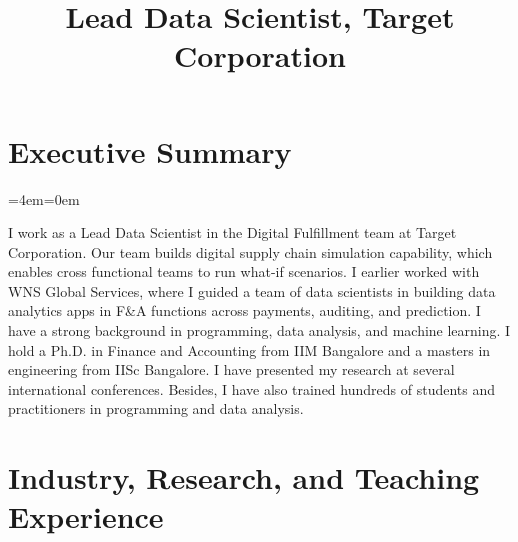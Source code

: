 \documentclass[11pt,a4paper,]{moderncv}
\title{Lead Data Scientist, Target Corporation}
\begin{document}
\makecvtitle



\newenvironment{smallblockquote}{%
  \par%
  \medskip
  \leftskip=2em\rightskip=0em%
  \noindent\ignorespaces}{%
  \par\medskip}

\newenvironment{blockquote}{%
  \par%
  \medskip
  \leftskip=4em\rightskip=0em%
  \noindent\ignorespaces}{%
  \par\medskip}

\hypertarget{executive-summary}{%
\section{Executive Summary}\label{executive-summary}}

\begingroup
\bgroup %
  \par%
  \medskip
  \leftskip=4em\rightskip=0em%
  \noindent\ignorespaces

I work as a Lead Data Scientist in the Digital Fulfillment team at Target Corporation. Our team builds digital supply chain simulation capability, which enables cross functional teams to run what-if scenarios. I earlier worked with WNS Global Services, where I guided a team of data scientists in building data analytics apps in F\&A functions across payments, auditing, and prediction. I have a strong background in programming, data analysis, and machine learning. I hold a Ph.D. in Finance and Accounting from IIM Bangalore and a masters in engineering from IISc Bangalore. I have presented my research at several international conferences. Besides, I have also trained hundreds of students and practitioners in programming and data analysis.

%
  \par\medskip\egroup 
\endgroup

\hypertarget{industry-research-and-teaching-experience}{%
\section{Industry, Research, and Teaching
Experience}\label{industry-research-and-teaching-experience}}
\end{document}
